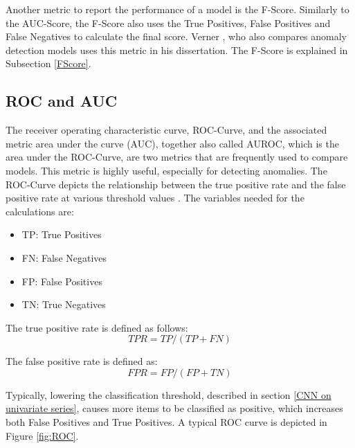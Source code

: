 Another metric to report the performance of a model is the F-Score. Similarly to the AUC-Score, the F-Score also uses the True Positives, False Positives and False Negatives to calculate the final score. Verner \parencite*{Verner2019}, who also compares anomaly detection models uses this metric in his dissertation. The F-Score is explained in Subsection \ref{FScore}.

\subsection{ROC and AUC} \label{AUROC}

The receiver operating characteristic curve, ROC-Curve, and the associated metric area under the curve (AUC), together also called AUROC, which is the area under the ROC-Curve, are two metrics that are frequently used to compare models. This metric is highly useful, especially for detecting anomalies. The ROC-Curve depicts the relationship between the true positive rate and the false positive rate at various threshold values \parencite{Google2021}. The variables needed for the calculations are:

\begin{itemize}
	\item TP: True Positives
	\item FN: False Negatives
	\item FP: False Positives
	\item TN: True Negatives	 
\end{itemize}

	
	The true positive rate is defined as follows: \[TPR = TP/(TP+FN)\]
	
	The false positive rate is defined as: \[FPR = FP/(FP+TN)\]

Typically, lowering the classification threshold, described in section \ref{CNN on univariate series}, causes more items to be classified as positive, which increases both False Positives and True Positives. A typical ROC curve is depicted in Figure \ref{fig:ROC}.

